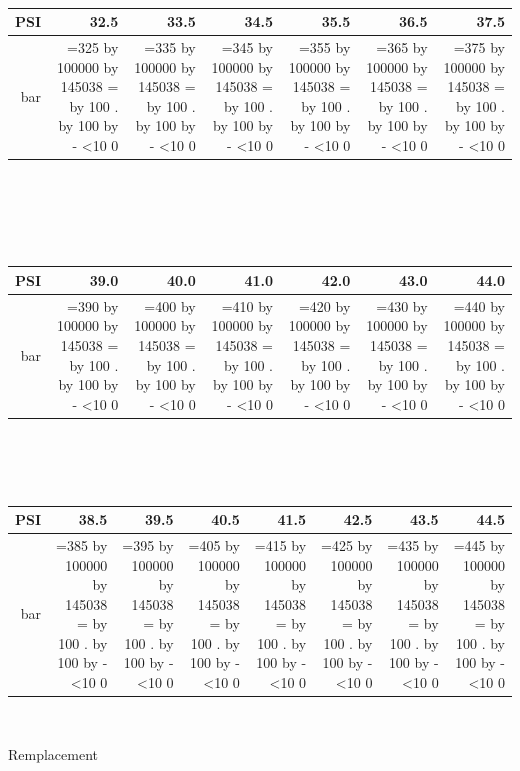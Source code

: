 \documentclass{livret}
\def\bar#1{%
    \count0=#1
    \multiply\count0 by 100000
    \divide\count0 by 145038
    \count1=\count0
    \divide\count1 by 100
    \number\count1.%
    \multiply\count1 by 100
    \advance\count0 by -\count1
    \ifnum\count0<10 0\number\count0{} \else \number\count0{} \fi
}
\begin{document}
\begin{center}
~\\
\begin{tabular}{|r|r|r|r|r|r|r|}\hline
PSI&32.5&33.5&34.5&35.5&36.5&37.5\\ \hline\hline
bar&\bar{325}&\bar{335}&\bar{345}&\bar{355}&\bar{365}&\bar{375}\\ \hline
\end{tabular}\\
~\\
~\\
~\\
\begin{tabular}{|r|r|r|r|r|r|r|}\hline
PSI&39.0&\textbf{40.0}&41.0&\textbf{42.0}&43.0&\textbf{44.0}\\ \hline\hline
bar&\bar{390}&\bar{400}&\bar{410}&\bar{420}&\bar{430}&\bar{440}\\ \hline
\end{tabular}\\
~\\
~\\
\begin{tabular}{|r|r|r|r|r|r|r|r|}\hline
PSI&38.5&39.5&40.5&41.5&42.5&43.5&44.5\\ \hline\hline
bar&\bar{385}&\bar{395}&\bar{405}&\bar{415}&\bar{425}&\bar{435}&\bar{445}\\ \hline
\end{tabular}\\
\end{center}
\newpage
\large{Remplacement}\normalsize\\
~\\
\end{document}
